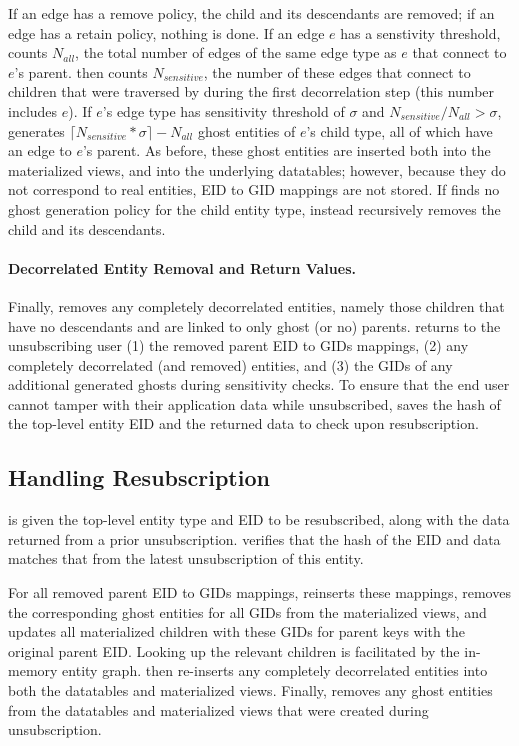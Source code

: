 If an edge has a remove policy, the child and its descendants are removed; if an edge has a retain
policy, nothing is done. 
If an edge $e$ has a senstivity threshold,
\sys{} counts $N_{all}$, the total number of edges of the same edge type as $e$ that connect to $e$'s parent.
\sys{} then counts $N_{sensitive}$, the number of these edges that connect to children that were traversed by \sys{} during the
first decorrelation step (this number includes $e$).
If $e$'s edge type has sensitivity threshold of $\sigma$ and $N_{sensitive} / N_{all} > \sigma$,
\sys{} generates $\lceil N_{sensitive}*\sigma\rceil - N_{all}$ ghost entities of $e$'s child type, all
of which have an edge to $e$'s parent.
As before, these ghost entities are inserted both into the materialized views, and into the underlying
datatables; however, because they do not correspond to real entities, EID to GID mappings are not
stored. 
If \sys{} finds no ghost generation policy for the child entity type, \sys{} instead recursively
removes the child and its descendants.

\paragraph{Decorrelated Entity Removal and Return Values.}
Finally, \sys{} removes any completely decorrelated entities, namely those children that have no
descendants and are linked to only ghost (or no) parents.
\sys{} returns to the unsubscribing user (1) the removed parent EID to GIDs mappings, (2) any completely decorrelated (and removed) entities,
and (3) the GIDs of any additional generated ghosts during sensitivity checks.
To ensure that the end user cannot tamper with their application data while unsubscribed, \sys{}
saves the hash of the top-level entity EID and the returned data to check upon resubscription.

\subsection{Handling Resubscription}
\sys{} is given the top-level entity type and EID to be resubscribed, along with the data returned
from a prior unsubscription.
\sys{} verifies that the hash of the EID and data matches that from the latest unsubscription of
this entity.

For all removed parent EID to GIDs mappings, \sys{} reinserts these mappings, removes the
corresponding ghost entities for all GIDs from the materialized views, and updates all materialized
children with these GIDs for parent keys with the original parent EID. Looking up the relevant
children is facilitated by the in-memory entity graph.  \sys{} then re-inserts any completely
decorrelated entities into both the datatables and materialized views.  Finally, \sys{} removes any
ghost entities from the datatables and materialized views that were created during unsubscription.


